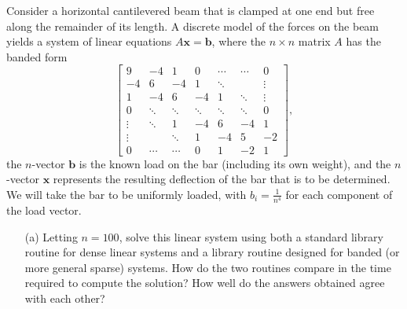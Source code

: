 \begin{pro}
  Consider a horizontal cantilevered beam that is
  clamped at one end but free along the remainder of its length.
  A discrete model of the forces on the beam yields a system of linear equations
  $A\mathbf{x} = \mathbf{b}$,
  where the $n\times n$ matrix $A$ has the banded form
  \begin{displaymath}
    \begin{bmatrix}
      9 & -4 & 1 & 0 & \cdots & \cdots & 0 \\
      -4 & 6 & -4 & 1 & \ddots & & \vdots \\
      1 & -4 & 6 & -4 & 1 & \ddots & \vdots \\
      0 & \ddots & \ddots & \ddots & \ddots & \ddots & 0 \\
      \vdots & \ddots & 1 & -4 & 6 & -4 & 1 \\
      \vdots &  & \ddots & 1 & -4 & 5 & -2 \\
      0 & \cdots & \cdots & 0 & 1 & -2 & 1
    \end{bmatrix},
  \end{displaymath}
  the $n$-vector $\mathbf{b}$ is the known load on the bar
  (including its own weight),
  and the $n$-vector $\mathbf{x}$ represents
  the resulting deflection of the bar that is to be determined.
  We will take the bar to be uniformly loaded,
  with $b_i = \frac{1}{n^4}$ for each component of the load vector.
  \begin{itemize}
  \item[(a)]
    Letting $n=100$, solve this linear system using
    both a standard library routine for dense linear systems
    and a library routine designed for banded (or more general sparse) systems.
    How do the two routines compare in the time required to compute the solution?
    How well do the answers obtained agree with each other?


\end{itemize}
\end{pro}
